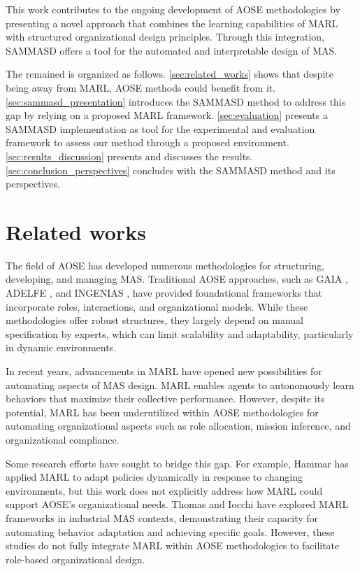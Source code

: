 \documentclass[conference]{IEEEtran}
\begin{document}
This work contributes to the ongoing development of AOSE methodologies by presenting a novel approach that combines the learning capabilities of MARL with structured organizational design principles. Through this integration, SAMMASD offers a tool for the automated and interpretable design of MAS.

The remained is organized as follows. \autoref{sec:related_works} shows that despite being away from MARL, AOSE methods could benefit from it. \autoref{sec:sammasd_presentation} introduces the SAMMASD method to address this gap by relying on a proposed MARL framework. \autoref{sec:evaluation} presents a SAMMASD implementation as tool for the experimental and evaluation framework to assess our method through a proposed environment. \autoref{sec:results_discussion} presents and discusses the results. \autoref{sec:conclusion_perspectives} concludes with the SAMMASD method and its perspectives.

\section{Related works}
\label{sec:related_works}

The field of AOSE has developed numerous methodologies for structuring, developing, and managing MAS. Traditional AOSE approaches, such as GAIA \cite{gaia1998}, ADELFE \cite{adelfe2002}, and INGENIAS \cite{ingenias2004}, have provided foundational frameworks that incorporate roles, interactions, and organizational models. While these methodologies offer robust structures, they largely depend on manual specification by experts, which can limit scalability and adaptability, particularly in dynamic environments.

In recent years, advancements in MARL have opened new possibilities for automating aspects of MAS design. MARL enables agents to autonomously learn behaviors that maximize their collective performance. However, despite its potential, MARL has been underutilized within AOSE methodologies for automating organizational aspects such as role allocation, mission inference, and organizational compliance.

Some research efforts have sought to bridge this gap. For example, Hammar \cite{hammar2019} has applied MARL to adapt policies dynamically in response to changing environments, but this work does not explicitly address how MARL could support AOSE's organizational needs. Thomas \cite{thomas2023} and Iocchi \cite{iocchi2023} have explored MARL frameworks in industrial MAS contexts, demonstrating their capacity for automating behavior adaptation and achieving specific goals. However, these studies do not fully integrate MARL within AOSE methodologies to facilitate role-based organizational design.
\end{document}
